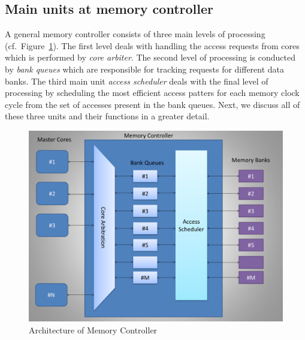 \subsection{Main units at memory controller}
A general memory controller consists of three main levels of processing (cf.~Figure~\ref{fig:pseudo-code}). The first level deals with handling the access requests from cores which is performed by {\em core arbiter}. The second level of processing is conducted by {\em bank queues} which are responsible for tracking requests for different data banks. The third main unit {\em access scheduler} deals with the final level of processing by scheduling the most efficient access patters for each memory clock cycle from the set of accesses present in the bank queues. Next, we discuss all of these three units and their functions in a greater detail.
\begin{figure}[htbp]
\centering
	\includegraphics[width=0.7\linewidth]{fig/controllerArchitecture.pdf}
\caption{
{Architecture of Memory Controller} }
\label{fig:pseudo-code}
\end{figure}
